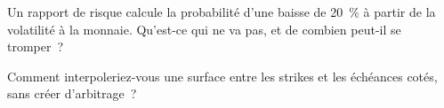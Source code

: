 \begin{interviewq}\label{iq:dv:implied-volatility-and-its-surface:5}
Un rapport de risque calcule la probabilité d'une baisse de 20~\% à partir de la volatilité à la monnaie. Qu'est-ce
qui ne va pas, et de combien peut-il se tromper~?
\end{interviewq}

\begin{interviewq}\label{iq:dv:implied-volatility-and-its-surface:6}
Comment interpoleriez-vous une surface entre les strikes et les échéances cotés, sans créer
d'arbitrage~?
\end{interviewq}
